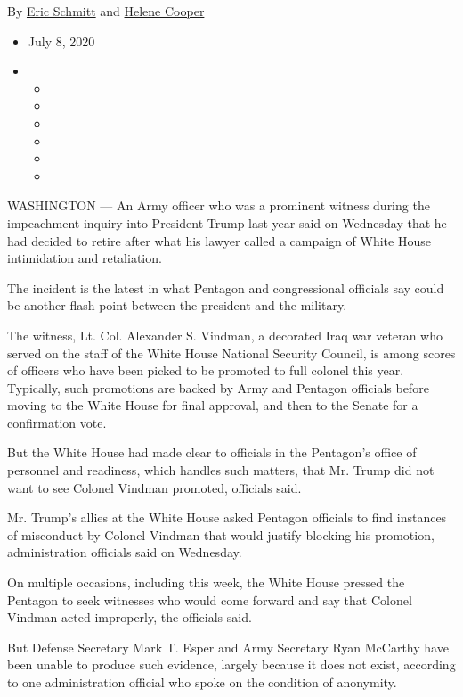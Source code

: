 By \href{https://www.nytimes.com/by/eric-schmitt}{Eric Schmitt} and
\href{https://www.nytimes.com/by/helene-cooper}{Helene Cooper}

\begin{itemize}
\item
  July 8, 2020
\item
  \begin{itemize}
  \item
  \item
  \item
  \item
  \item
  \item
  \end{itemize}
\end{itemize}

WASHINGTON --- An Army officer who was a prominent witness during the
impeachment inquiry into President Trump last year said on Wednesday
that he had decided to retire after what his lawyer called a campaign of
White House intimidation and retaliation.

The incident is the latest in what Pentagon and congressional officials
say could be another flash point between the president and the military.

The witness, Lt. Col. Alexander S. Vindman, a decorated Iraq war veteran
who served on the staff of the White House National Security Council, is
among scores of officers who have been picked to be promoted to full
colonel this year. Typically, such promotions are backed by Army and
Pentagon officials before moving to the White House for final approval,
and then to the Senate for a confirmation vote.

But the White House had made clear to officials in the Pentagon's office
of personnel and readiness, which handles such matters, that Mr. Trump
did not want to see Colonel Vindman promoted, officials said.

Mr. Trump's allies at the White House asked Pentagon officials to find
instances of misconduct by Colonel Vindman that would justify blocking
his promotion, administration officials said on Wednesday.

On multiple occasions, including this week, the White House pressed the
Pentagon to seek witnesses who would come forward and say that Colonel
Vindman acted improperly, the officials said.

But Defense Secretary Mark T. Esper and Army Secretary Ryan McCarthy
have been unable to produce such evidence, largely because it does not
exist, according to one administration official who spoke on the
condition of anonymity.

